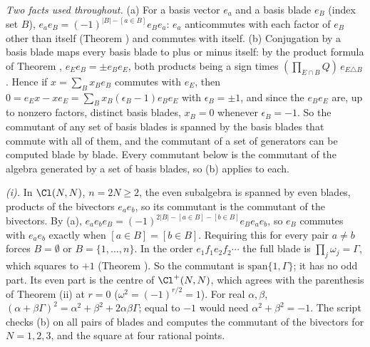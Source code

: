 \emph{Two facts used throughout.} (a) For a basis vector $e_{a}$ and a basis blade $e_{B}$ (index set $B$), $e_{a}e_{B} = (-1)^{|B| - [a \in B]}e_{B}e_{a}$: $e_{a}$ anticommutes with each factor of $e_{B}$ other than itself (Theorem ) and commutes with itself. (b) Conjugation by a basis blade maps every basis blade to plus or minus itself: by the product formula of Theorem , $e_{E}e_{B} = \pm e_{B}e_{E}$, both products being a sign times $(\prod_{E \cap B}Q)\,e_{E \triangle B}$. Hence if $x = \sum_{B}x_{B}e_{B}$ commutes with $e_{E}$, then $0 = e_{E}x - xe_{E} = \sum_{B}x_{B}(\epsilon_{B} - 1)e_{B}e_{E}$ with $\epsilon_{B} = \pm 1$, and since the $e_{B}e_{E}$ are, up to nonzero factors, distinct basis blades, $x_{B} = 0$ whenever $\epsilon_{B} = -1$. So the commutant of any set of basis blades is spanned by the basis blades that commute with all of them, and the commutant of a set of generators can be computed blade by blade. Every commutant below is the commutant of the algebra generated by a set of basis blades, so (b) applies to each.

\emph{(i).} In $\Cl(N,N)$, $n = 2N \ge 2$, the even subalgebra is spanned by even blades, products of the bivectors $e_{a}e_{b}$, so its commutant is the commutant of the bivectors. By (a), $e_{a}e_{b}e_{B} = (-1)^{2|B| - [a \in B] - [b \in B]}e_{B}e_{a}e_{b}$, so $e_{B}$ commutes with $e_{a}e_{b}$ exactly when $[a \in B] = [b \in B]$. Requiring this for every pair $a \ne b$ forces $B = \emptyset$ or $B = \{1, \dots, n\}$. In the order $e_{1}f_{1}e_{2}f_{2}\cdots$ the full blade is $\prod_{j}\omega_{j} = \Gamma$, which squares to $+1$ (Theorem ). So the commutant is $\mathrm{span}\{1, \Gamma\}$; it has no odd part. Its even part is the centre of $\Cl^{+}(N,N)$, which agrees with the parenthesis of Theorem (ii) at $r = 0$ ($\omega^{2} = (-1)^{r/2} = 1$). For real $\alpha, \beta$, $(\alpha + \beta\Gamma)^{2} = \alpha^{2} + \beta^{2} + 2\alpha\beta\Gamma$; equal to $-1$ would need $\alpha^{2} + \beta^{2} = -1$. The script checks (b) on all pairs of blades and computes the commutant of the bivectors for $N = 1, 2, 3$, and the square at four rational points.

